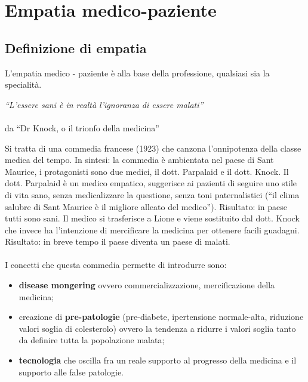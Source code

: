 \section{Empatia medico-paziente}

\subsection{Definizione di empatia}

L'empatia medico - paziente è alla base della professione, qualsiasi sia
la specialità.

\emph{``L'essere sani è in realtà l'ignoranza di essere malati''}
\\\\
da ``Dr Knock, o il trionfo della medicina''

Si tratta di una commedia francese (1923) che canzona l'onnipotenza
della classe medica del tempo. In sintesi: la commedia è ambientata nel
paese di Sant Maurice, i protagonisti sono due medici, il dott.
Parpalaid e il dott. Knock. Il dott. Parpalaid è un medico empatico,
suggerisce ai pazienti di seguire uno stile di vita sano, senza
medicalizzare la questione, senza toni paternalistici (``il clima
salubre di Sant Maurice è il migliore alleato del medico''). Risultato:
in paese tutti sono sani. Il medico si trasferisce a Lione e viene
sostituito dal dott. Knock che invece ha l'intenzione di mercificare la
medicina per ottenere facili guadagni. Risultato: in breve tempo il
paese diventa un paese di malati.
\\\\
I concetti che questa commedia permette di introdurre sono:

\begin{itemize}
\item
  \textbf{disease mongering} ovvero commercializzazione, mercificazione
  della medicina;
\item
  creazione di \textbf{pre-patologie} (pre-diabete, ipertensione
  normale-alta, riduzione valori soglia di colesterolo) ovvero la
  tendenza a ridurre i valori soglia tanto da definire tutta la
  popolazione malata;
\item
  \textbf{tecnologia} che oscilla fra un reale supporto al progresso
  della medicina e il supporto alle false patologie.
\end{itemize}


